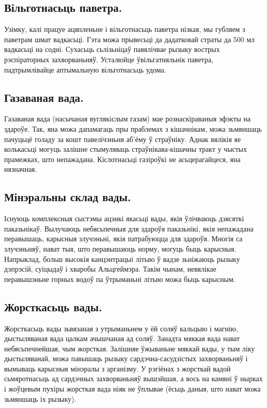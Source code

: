 \subsection{Вільготнасьць паветра.}
Узімку, калі працуе ацяпленьне і вільготнасьць паветра нізкая, мы губляем з паветрам шмат вадкасьці. Гэта можа прывесьці да дадатковай страты да 500 мл вадкасьці на содні. Сухасьць сьлізьніцаў павялічвае рызыку вострых рэспіраторных захворваньняў. Усталюйце ўвільгатняльнік паветра, падтрымлівайце аптымальную вільготнасьць удома.

\subsection{Газаваная вада.}
Газаваная вада (насычаная вуглякіслым газам) мае рознаскіраваныя эфэкты на здароўе. Так, яна можа дапамагаць пры праблемах з кішачнікам, можа зьмяншаць пачуцьцё голаду за кошт павелічэньня аб'ёму ў страўніку. Аднак вялікія яе колькасьці могуць залішне стымуляваць страўнікава-кішачны тракт у чыстых прамежках, што непажадана. Кіслотнасьці газіроўкі не асьцерагайцеся, яна нязначная.

\subsection{Мінэральны склад вады.}
Існуюць комплексныя сыстэмы ацэнкі якасьці вады, якія ўлічваюць дзясяткі паказьнікаў. Вылучаюць небясьпечныя для здароўя паказьнікі, якія непажадана перавышаць, карысныя злучэньні, якія патрабуюцца для здароўя. Многія са злучэньняў, нават тыя, што перавышаюць норму, могуць быць карысныя. Напрыклад, больш высокія канцэнтрацыі літыю ў вадзе зьніжаюць рызыку дэпрэсій, суіцыдаў і хваробы Альцгеймэра. Такім чынам, невялікае перавышэньне горных водоў па ўтрыманьні літыю можа быць карысным.

\subsection{Жорсткасьць вады.}
Жорсткасьць вады зьвязаная з утрыманьнем у ёй соляў кальцыю і магнію, дыстыляваная вада цалкам ачышчаная ад соляў. Занадта мяккая вада нават небясьпечнейшая, чым жорсткая. Залішняе ўжываньне мяккай вады, у тым ліку дыстыляванай, можа павышаць рызыку сардэчна-сасудзістых захворваньняў і вымываць карысныя мінэралы з арганізму. У рэгіёнах з жорсткай вадой сьмяротнасьць ад сардэчных захворваньняў вышэйшая, а вось на камяні ў нырках і жоўцевым пухіры жорсткая вада ніяк не ўплывае (ёсьць даныя, што нават можа зьмяншаць іх рызыку).

